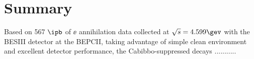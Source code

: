 \section{Summary}
Based on 567 $\ipb$ of $\ee$ annihilation data collected at $\sqrt{s}=4.599\gev$ with
the BESIII detector at the BEPCII, taking advantage of simple clean environment and
excellent detector performance, the Cabibbo-suppressed decays ...........


